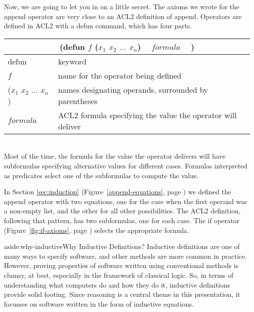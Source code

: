 Now, we are going to let you in on a little secret.
The axioms we wrote for the \textsf{append} operator are very
close to an ACL2 definition of \textsf{append}.
Operators are defined in ACL2 with a \textsf{defun} command,
which has four parts.
\vspace{2mm}

\begin{tabular}{ll}
\multicolumn{2}{c}{\textsf{(defun $f$ ($x_1$ $x_2$ $\dots$ $x_n$) ~ $formula$ ~ )}}\\
\hline
\textsf{defun}                       & keyword\\
$f$                                  & name for the operator being defined\\
\textsf{($x_1$ $x_2$ $\dots$ $x_n$)} & names designating operands, surrounded by parentheses\\
$formula$                            & ACL2 formula specifying the value the operator will deliver\\
\end{tabular}
\\

Most of the time, the formula for the value the operator delivers
will have subformulas specifying alternative values for different cases.
Formulas interpreted as predicates select one of
the subformulas to compute the value.

In Section \ref{sec:induction} (Figure~\ref{append-equations}, page \pageref{append-equations})
we defined the \textsf{append} operator with two equations,
one for the case when the first operand was a non-empty list,
and the other for all other possibilities.
The ACL2 definition, following that pattern, has two subformulas,
one for each case.
The \textsf{if} operator (Figure~\ref{fig:if-axioms}, page \pageref{fig:if-axioms})
selects the appropriate formula.

\begin{aside}{aside:why-inductive}{Why Inductive Definitions?}
Inductive
definitions are one of many ways to specify software,
and other methods are more common in practice.
However, proving properties of software written using conventional methods
is clumsy, at best, especially in the framework of classical logic.
So, in terms of understanding what computers do and how they do it,
inductive definitions provide solid footing.
Since reasoning is a central theme in this presentation,
it focusses on software written
in the form of inductive equations.
\end{aside}

